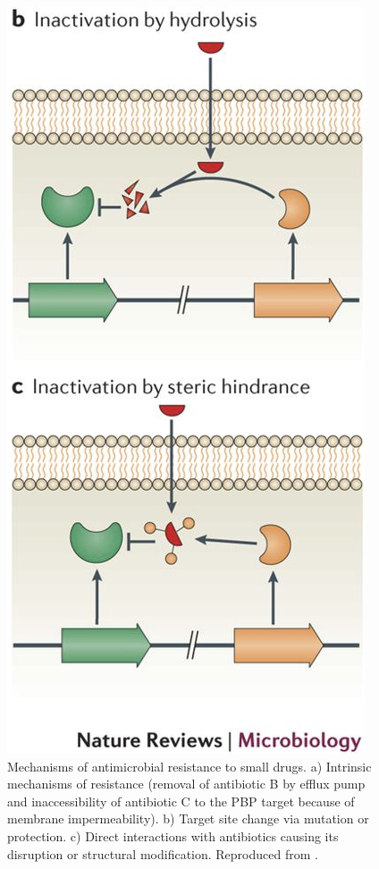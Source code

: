 \begin{figure}[h]
\begin{center}
\includegraphics[height = 0.36\textheight]{pics/amr4_half}
\caption[Mechanisms of antimicrobial resistance to small drugs]{Mechanisms of antimicrobial resistance to small drugs. a) Intrinsic mechanisms of resistance (removal of antibiotic B by efflux pump and inaccessibility of antibiotic C to the PBP target because of membrane impermeability). b) Target site change via mutation or protection. c) Direct interactions with antibiotics causing its disruption or structural modification. Reproduced from \cite{Blair2014}.} \label{fig:amr}
\end{center}
\end{figure}


